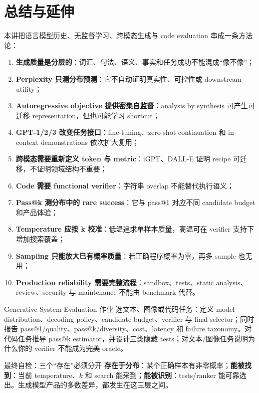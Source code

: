 \documentclass[a4paper]{article}
\begin{document}
\section{总结与延伸}

本讲把语言模型历史、无监督学习、跨模态生成与 code evaluation 串成一条方法论：

\begin{enumerate}
  \item \textbf{生成质量是分层的}：词汇、句法、语义、事实和任务成功不能混成“像不像”；
  \item \textbf{Perplexity 只测分布预测}：它不自动证明真实性、可控性或 downstream utility；
  \item \textbf{Autoregressive objective 提供密集自监督}：analysis by synthesis 可产生可迁移 representation，但也可能学习 shortcut；
  \item \textbf{GPT-1/2/3 改变任务接口}：fine-tuning、zero-shot continuation 和 in-context demonstrations 依次扩大复用；
  \item \textbf{跨模态需要重新定义 token 与 metric}：iGPT、DALL-E 证明 recipe 可迁移，不证明领域结构不重要；
  \item \textbf{Code 需要 functional verifier}：字符串 overlap 不能替代执行语义；
  \item \textbf{Pass@k 测分布中的 rare success}：它与 pass@1 对应不同 candidate budget 和产品体验；
  \item \textbf{Temperature 应按 k 校准}：低温追求单样本质量，高温可在 verifier 支持下增加搜索覆盖；
  \item \textbf{Sampling 只能放大已有概率质量}：若正确程序概率为零，再多 sample 也无用；
  \item \textbf{Production reliability 需要完整流程}：sandbox、tests、static analysis、review、security 与 maintenance 不能由 benchmark 代替。
\end{enumerate}

\begin{importantbox}{Generative-System Evaluation 作业}
选文本、图像或代码任务：定义 model distribution、decoding policy、candidate budget、verifier 与 final selector；同时报告 pass@1/quality、pass@k/diversity、cost、latency 和 failure taxonomy。对代码任务推导 pass@k estimator，并设计三类隐藏 tests；对文本/图像任务说明为什么你的 verifier 不能成为完美 oracle。
\end{importantbox}

\begin{knowledgebox}{最终自检：三个“存在”必须分开}
\textbf{存在于分布}：某个正确样本有非零概率；\textbf{能被找到}：当前 temperature、$k$ 和 search 能采到；\textbf{能被识别}：tests/ranker 能可靠选出。生成模型产品的多数差异，都发生在这三层之间。
\end{knowledgebox}
\end{document}
